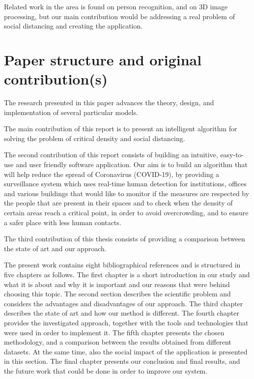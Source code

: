 \documentclass[runningheads,a4paper,11pt]{report}
\begin{document}
Related work in the area is found on person recognition, and on 3D image processing, but our main contribution would be addressing a real problem of social distancing and creating the application.


\section{Paper structure and original contribution(s)}
\label{section:structure}

The research presented in this paper advances the theory, design, and implementation of several particular models. 

The main contribution of this report is to present an intelligent algorithm for solving the problem of critical density and social distancing.

The second contribution of this report consists of building an intuitive, easy-to-use and user friendly software application. Our aim is to build an algorithm that will help reduce the spread of Coronavirus (COVID-19), by providing a surveillance system which uses real-time human detection for institutions, offices and various buildings that would like to monitor if the measures are respected by the people that are present in their spaces and to check when the density of certain areas reach a critical point, in order to avoid overcrowding, and to ensure a safer place with less human contacts.

The third contribution of this thesis consists of providing a comparison between the state of art and our approach.


The present work contains eight bibliographical references and is structured in five chapters as follows. The first chapter is a short introduction in our study and what it is about and why it is important and our reasons that were behind choosing this topic. The second section describes the scientific problem and considers the advantages and disadvantages of our approach. The third chapter describes the state of art and how our method is different. The fourth chapter provides the investigated approach, together with the tools and technologies that were used in order to implement it. The fifth chapter presents the chosen methodology, and a comparison between the results obtained from different datasets. At the same time, also the social impact of the application is presented in this section. The final chapter presents our conclusion and final results, and the future work that could be done in order to improve our system.
\end{document}
